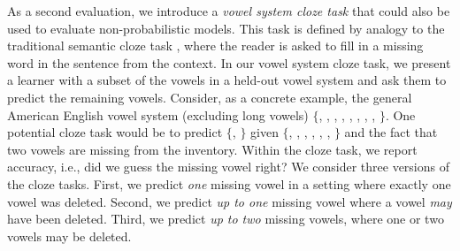 \documentclass[11pt,a4paper]{article}
\renewcommand{\cite}[2][]{\citep[#1]{#2}}
\newcommand{\phone}[1]{\textipa{[#1]}}
\begin{document}
As a second evaluation, we introduce a {\em vowel system cloze task} that 
could also be used to evaluate non-probabilistic models. This task is defined by analogy to the traditional
semantic cloze task \cite{taylor1953cloze}, where the reader is asked
to fill in a missing word in the sentence from the context. In our
vowel system cloze task, we present a learner with a subset of the
vowels in a held-out vowel system and ask them to predict the remaining
vowels.  Consider, as a concrete example, the general American English vowel
system (excluding long vowels) $\{$\phone{i}, \phone{I}, \phone{u},
\phone{U}, \phone{E}, \phone{\ae}, \phone{O},
\phone{A}, \phone{@}$\}$. One potential cloze task would be to
predict $\{$\phone{i}, \phone{u}$\}$ given $\{$\phone{I}, \phone{U},
\phone{E}, \phone{\ae}, \phone{O}, \phone{A},
\phone{@}$\}$ and the fact that two vowels are missing from the
inventory. Within the cloze task, we report accuracy, i.e., did we
guess the missing vowel right? We consider three versions of the cloze tasks. First, we
predict {\em one} missing vowel in a setting where exactly one
vowel was deleted. Second, we predict {\em up to one} missing vowel
where a vowel {\em may} have been deleted. Third, we predict {\em up to two}
missing vowels, where one or two vowels may be deleted.
\end{document}
